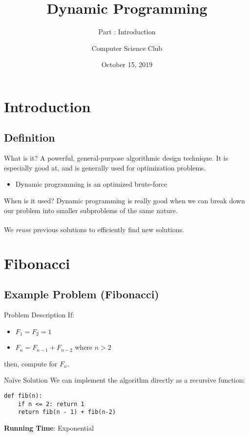 \documentclass{beamer}
\title{Dynamic Programming}
\subtitle{Part \rom{1}: Introduction}
\institute{Stephen Lewis Secondary School}
\author{Computer Science Club}
\date{October 15, 2019}
\begin{document}
\begin{frame}
\titlepage
\end{frame}

\section{Introduction}
\subsection{Definition}
\begin{frame}{What is it?}
    A powerful, general-purpose algorithmic design technique. It is especially good at, and is generally used for optimization problems.
    \begin{itemize}
        \item Dynamic programming is an optimized brute-force
    \end{itemize}
\end{frame}

\begin{frame}{When is it used?}
    Dynamic programming is really good when we can break down our problem into smaller subproblems of the same nature.\\~\\We \textit{reuse} previous solutions to efficiently find new solutions.
\end{frame}

\section{Fibonacci}
\subsection{Example Problem (Fibonacci)}
\begin{frame}{Problem Description}
If:
    \begin{itemize}
        \item $F_1=F_2=1$
        \item $F_n=F_{n-1}+F_{n-2}$ where $n > 2$
    \end{itemize}
    
then, compute for $F_n$.
\end{frame}

\begin{frame}[fragile]{Na\"{i}ve Solution}
    We can implement the algorithm directly as a recursive function:
\begin{center}
\begin{lstlisting}[language=iPython]
def fib(n):
    if n <= 2: return 1
    return fib(n - 1) + fib(n-2)
\end{lstlisting}
\end{center}

\textbf{Running Time}: Exponential
\end{frame}
\end{document}
